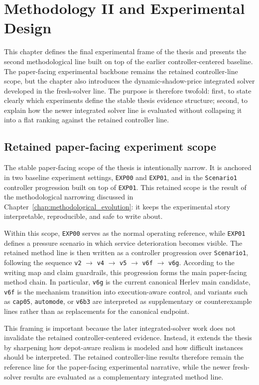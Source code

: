 \chapter{Methodology II and Experimental Design}
\label{chap:experimental_design}

This chapter defines the final experimental frame of the thesis and presents the second methodological line built on top of the earlier controller-centered baseline. The paper-facing experimental backbone remains the retained controller-line scope, but the chapter also introduces the dynamic-shadow-price integrated solver developed in the fresh-solver line. The purpose is therefore twofold: first, to state clearly which experiments define the stable thesis evidence structure; second, to explain how the newer integrated solver line is evaluated without collapsing it into a flat ranking against the retained controller line.

\section{Retained paper-facing experiment scope}

The stable paper-facing scope of the thesis is intentionally narrow. It is anchored in two baseline experiment settings, \texttt{EXP00} and \texttt{EXP01}, and in the \texttt{Scenario1} controller progression built on top of \texttt{EXP01}. This retained scope is the result of the methodological narrowing discussed in Chapter~\ref{chap:methodological_evolution}: it keeps the experimental story interpretable, reproducible, and safe to write about.

Within this scope, \texttt{EXP00} serves as the normal operating reference, while \texttt{EXP01} defines a pressure scenario in which service deterioration becomes visible. The retained method line is then written as a controller progression over \texttt{Scenario1}, following the sequence \texttt{v2} $\rightarrow$ \texttt{v4} $\rightarrow$ \texttt{v5} $\rightarrow$ \texttt{v6f} $\rightarrow$ \texttt{v6g}. According to the writing map and claim guardrails, this progression forms the main paper-facing method chain. In particular, \texttt{v6g} is the current canonical Herlev main candidate, \texttt{v6f} is the mechanism transition into execution-aware control, and variants such as \texttt{cap05}, \texttt{automode}, or \texttt{v6b3} are interpreted as supplementary or counterexample lines rather than as replacements for the canonical endpoint.

This framing is important because the later integrated-solver work does not invalidate the retained controller-centered evidence. Instead, it extends the thesis by sharpening how depot-aware realism is modeled and how difficult instances should be interpreted. The retained controller-line results therefore remain the reference line for the paper-facing experimental narrative, while the newer fresh-solver results are evaluated as a complementary integrated method line.

